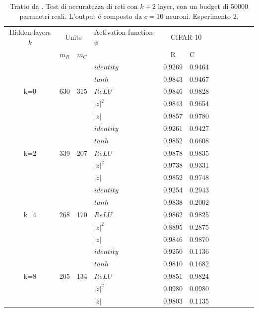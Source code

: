 \documentclass[a4paper,12pt]{report}
\begin{document}
 \newpage
 
 \begin{table}[h]
  \centering
  \begin{tabular}{cp{} cp{} cp{}   cp{} cp{} cp{}}
   \cline{1-6}
   Hidden layers $k$ & \multicolumn{2}{c}{Units} $p_R$ & Activation function $\phi$ & \multicolumn{2}{c}{CIFAR-10}\\
   \cline{2-3} \cline{5-6}
   & $m_R$ & $m_C$ & & R & C \\
   \cline{1-6}
   & & & $identity$ & 0.9269 & 0.9464 \\
   \cline{4-6}
   & & & $tanh$ & 0.9843 & 0.9467 \\
   \cline{4-6}
   k=0 & 630 & 315 & $ReLU$ & 0.9846 & 0.9828 \\
   \cline{4-6}
   & & & $|z|^2$ & 0.9843 & 0.9654 \\
   \cline{4-6}
   & & & $|z|$ & 0.9857 & 0.9780 \\
   \cline{1-6}
   
   \cline{1-6}
   & & & $identity$ & 0.9261 & 0.9427 \\
   \cline{4-6}
   & & & $tanh$ & 0.9852 & 0.6608 \\
   \cline{4-6}
   k=2 & 339 & 207 & $ReLU$ & 0.9878 & 0.9835 \\
   \cline{4-6}
   & & & $|z|^2$ & 0.9738 & 0.9331 \\
   \cline{4-6}
   & & & $|z|$ & 0.9852 & 0.9748 \\
   \cline{1-6}
   
   \cline{1-6}
   & & & $identity$ & 0.9254 & 0.2943 \\
   \cline{4-6}
   & & & $tanh$ & 0.9838 & 0.2002 \\
   \cline{4-6}
   k=4 & 268 & 170 & $ReLU$ & 0.9862 & 0.9825 \\
   \cline{4-6}
   & & & $|z|^2$ & 0.8895 & 0.2875 \\
   \cline{4-6}
   & & & $|z|$ & 0.9846 & 0.9870 \\
   \cline{1-6}
   
   \cline{1-6}
   & & & $identity$ & 0.9250 & 0.1136 \\
   \cline{4-6}
   & & & $tanh$ & 0.9810 & 0.1682 \\
   \cline{4-6}
   k=8 & 205 & 134 & $ReLU$ & 0.9851 & 0.9824 \\
   \cline{4-6}
   & & & $|z|^2$ & 0.0980 & 0.0980 \\
   \cline{4-6}
   & & & $|z|$ & 0.9803 & 0.1135 \\
   \cline{1-6}
      
  \end{tabular}
  \caption{Tratto da \cite{monning2018evaluation}. Test di accuratezza di reti con $k+2$ layer, con un budget di 50000 parametri reali. L'output \'e composto da $c=10$ neuroni. Esperimento 2.}
  \label{CIFAR-102Tab}
 \end{table}
  
\end{document}
